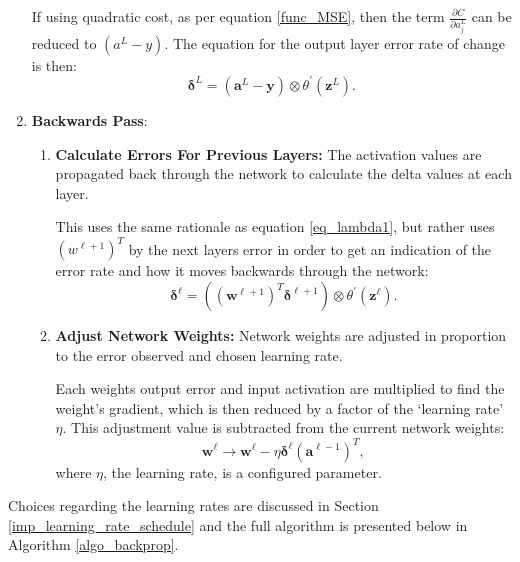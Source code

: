 \documentclass[a4paper,11pt,oneside]{article}
\theoremstyle{plain}
\theoremstyle{definition}
\begin{document}
\begin{enumerate}
		If using quadratic cost, as per equation \eqref{func_MSE}, then the term $\frac{\partial C}{\partial a_{j}^{L}}$ can be reduced to $(a^L - y)$. The equation for the output layer error rate of change is then:
		\begin{equation}\label{eq_lambda3}
		\mathbf{\delta}^L = (\mathbf{a}^L - \mathbf{y}) \otimes \theta^{\prime}(\mathbf{z}^L) .
		\end{equation}
		\newline		
		\item \textbf{Backwards Pass}: 
		\begin{enumerate}
			\item \textbf{Calculate Errors For Previous Layers:} The activation values are propagated back through the network to calculate the delta values at each layer. \newline
			
			This uses the same rationale as equation \eqref{eq_lambda1}, but rather uses $(w^{\ell+1})^T$ by the next layers error in order to get an indication of the error rate and how it moves backwards through the network:
			\begin{equation}\label{eq_lambda4}
			\mathbf{\delta}^\ell = ((\mathbf{w}^{\ell+1})^T\mathbf{\delta}^{\ell+1})  \otimes \theta^{\prime}(\mathbf{z}^\ell) .
			\end{equation}
			
			\item \textbf{Adjust Network Weights:} Network weights are adjusted in proportion to the error observed and chosen learning rate.\newline
			
			Each weights output error and input activation are multiplied to find the weight’s gradient, which is then reduced by a factor of the ‘learning rate’ $\eta$. This adjustment value is subtracted from the current network weights:
			\begin{equation}\label{eq_bp_weightupdate}
			\mathbf{w}^\ell \rightarrow \mathbf{w}^\ell - {\eta}\mathbf{\delta}^{\ell} (\mathbf{a}^{\ell - 1})^T ,
			\end{equation}
			where $\eta$, the learning rate, is a configured parameter.
		\end{enumerate}
		
	\end{enumerate}
	
	Choices regarding the learning rates are discussed in Section \ref{imp_learning_rate_schedule} and the full algorithm is presented below in Algorithm \ref{algo_backprop}.\newline
	
\end{document}
